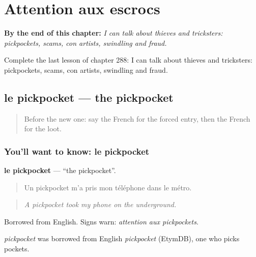 
\chapter{Attention aux escrocs}
\label{ch:fr-attention-aux-escrocs}

\begin{chapteropening}
\textbf{By the end of this chapter:} \emph{I can talk about thieves and tricksters: pickpockets, scams, con artists, swindling and fraud.}

Complete the last lesson of chapter 288: I can talk about thieves and tricksters: pickpockets, scams, con artists, swindling and fraud.
\end{chapteropening}

\section[le pickpocket]{le pickpocket — the pickpocket}

\label{lesson:FR-C288-pickpocket}



\begin{quote}
Before the new one: say the French for the forced entry, then the French for the loot.
\end{quote}

\subsection*{You'll want to know: le pickpocket}
\textbf{le pickpocket} — \textquotedblleft{}the pickpocket\textquotedblright{}.

\begin{quote}
Un pickpocket m'a pris mon téléphone dans le métro.
\end{quote}

\begin{quote}
\emph{A pickpocket took my phone on the underground.}
\end{quote}

Borrowed from English. Signs warn: \emph{attention aux pickpockets}.

\begin{cousinweb}
\emph{pickpocket} was borrowed from English \emph{pickpocket} (EtymDB), one who picks pockets.
\end{cousinweb}

